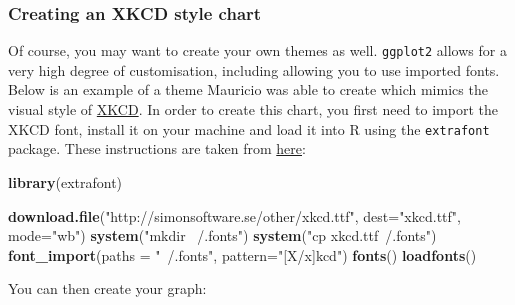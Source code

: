 \documentclass[]{article}
\newenvironment{Shaded}{\begin{snugshade}}{\end{snugshade}}
\newcommand{\KeywordTok}[1]{\textcolor[rgb]{0.13,0.29,0.53}{\textbf{{#1}}}}
\newcommand{\DataTypeTok}[1]{\textcolor[rgb]{0.13,0.29,0.53}{{#1}}}
\newcommand{\StringTok}[1]{\textcolor[rgb]{0.31,0.60,0.02}{{#1}}}
\newcommand{\NormalTok}[1]{{#1}}
\begin{document}
\subsubsection{Creating an XKCD style
chart}\label{creating-an-xkcd-style-chart-5}

Of course, you may want to create your own themes as well.
\texttt{ggplot2} allows for a very high degree of customisation,
including allowing you to use imported fonts. Below is an example of a
theme Mauricio was able to create which mimics the visual style of
\href{http://xkcd.com/}{XKCD}. In order to create this chart, you first
need to import the XKCD font, install it on your machine and load it
into R using the \texttt{extrafont} package. These instructions are
taken from
\href{https://www.google.com.au/url?sa=t\&rct=j\&q=\&esrc=s\&source=web\&cd=1\&ved=0ahUKEwiWzafchdPJAhVBpJQKHe_LDT8QFggbMAA\&url=https\%3A\%2F\%2Fcran.r-project.org\%2Fweb\%2Fpackages\%2Fxkcd\%2Fvignettes\%2Fxkcd-intro.pdf\&usg=AFQjCNE-KciGY14e-Q1buYIVmTFC0ht__Q\&sig2=DZUwkvIHwfNWtTtkcz94jg}{here}:

\begin{Shaded}
\begin{Highlighting}[]
\KeywordTok{library}\NormalTok{(extrafont)}

\KeywordTok{download.file}\NormalTok{(}\StringTok{"http://simonsoftware.se/other/xkcd.ttf"}\NormalTok{, }
\DataTypeTok{dest=}\StringTok{"xkcd.ttf"}\NormalTok{, }\DataTypeTok{mode=}\StringTok{"wb"}\NormalTok{)}
\KeywordTok{system}\NormalTok{(}\StringTok{"mkdir ~/.fonts"}\NormalTok{)}
\KeywordTok{system}\NormalTok{(}\StringTok{"cp xkcd.ttf~/.fonts"}\NormalTok{)}
\KeywordTok{font_import}\NormalTok{(}\DataTypeTok{paths =} \StringTok{"~/.fonts"}\NormalTok{, }\DataTypeTok{pattern=}\StringTok{"[X/x]kcd"}\NormalTok{)}
\KeywordTok{fonts}\NormalTok{()}
\KeywordTok{loadfonts}\NormalTok{()}
\end{Highlighting}
\end{Shaded}

You can then create your graph:
\end{document}
